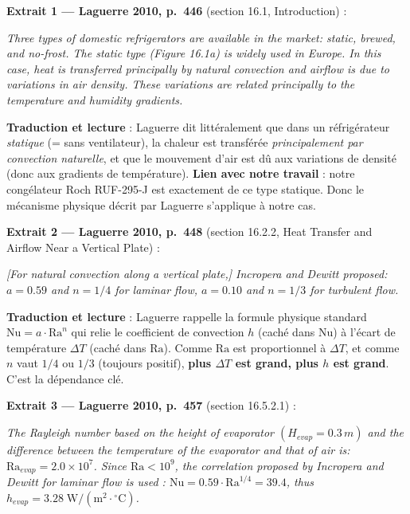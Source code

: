 \documentclass[11pt,a4paper]{article}
\begin{document}
\medskip
\textbf{Extrait 1 — Laguerre 2010, p.~446} (section 16.1, Introduction) :

\begin{tcolorbox}[breakable,enhanced jigsaw,colback=yellow!10,colframe=yellow!50!black,boxrule=0.4pt,arc=2pt]
\og{} \emph{Three types of domestic refrigerators are available in the market: static,
brewed, and no-frost. The static type (Figure 16.1a) is widely used in Europe. In this
case, heat is transferred principally by natural convection and airflow is due to
variations in air density. These variations are related principally to the temperature
and humidity gradients.} \fg{}
\end{tcolorbox}

\textbf{Traduction et lecture} : Laguerre dit littéralement que dans un réfrigérateur
\emph{statique} (= sans ventilateur), la chaleur est transférée \emph{principalement par
convection naturelle}, et que le mouvement d'air est dû aux variations de densité (donc
aux gradients de température). \textbf{Lien avec notre travail} : notre congélateur Roch
RUF-295-J est exactement de ce type statique. Donc le mécanisme physique décrit par
Laguerre s'applique à notre cas.

\medskip
\textbf{Extrait 2 — Laguerre 2010, p.~448} (section 16.2.2, Heat Transfer and Airflow
Near a Vertical Plate) :

\begin{tcolorbox}[breakable,enhanced jigsaw,colback=yellow!10,colframe=yellow!50!black,boxrule=0.4pt,arc=2pt]
\og{} \emph{[For natural convection along a vertical plate,] Incropera and Dewitt
proposed: $a = 0.59$ and $n = 1/4$ for laminar flow, $a = 0.10$ and $n = 1/3$ for
turbulent flow.} \fg{}
\end{tcolorbox}

\textbf{Traduction et lecture} : Laguerre rappelle la formule physique standard
$\mathrm{Nu} = a \cdot \mathrm{Ra}^n$ qui relie le coefficient de convection $h$ (caché
dans $\mathrm{Nu}$) à l'écart de température $\Delta T$ (caché dans $\mathrm{Ra}$). Comme
$\mathrm{Ra}$ est proportionnel à $\Delta T$, et comme $n$ vaut $1/4$ ou $1/3$ (toujours
positif), \textbf{plus $\Delta T$ est grand, plus $h$ est grand}. C'est la dépendance
clé.

\medskip
\textbf{Extrait 3 — Laguerre 2010, p.~457} (section 16.5.2.1) :

\begin{tcolorbox}[breakable,enhanced jigsaw,colback=yellow!10,colframe=yellow!50!black,boxrule=0.4pt,arc=2pt]
\og{} \emph{The Rayleigh number based on the height of evaporator $(H_{evap} = 0.3\,m)$
and the difference between the temperature of the evaporator and that of air is:
$\mathrm{Ra}_{evap} = 2.0 \times 10^7$. Since $\mathrm{Ra} < 10^9$, the correlation
proposed by Incropera and Dewitt for laminar flow is used : $\mathrm{Nu} = 0.59 \cdot
\mathrm{Ra}^{1/4} = 39.4$, thus $h_{evap} = 3.28\;\mathrm{W/(m^2 \cdot {}^\circ C)}$.}
\fg{}
\end{tcolorbox}
\end{document}
